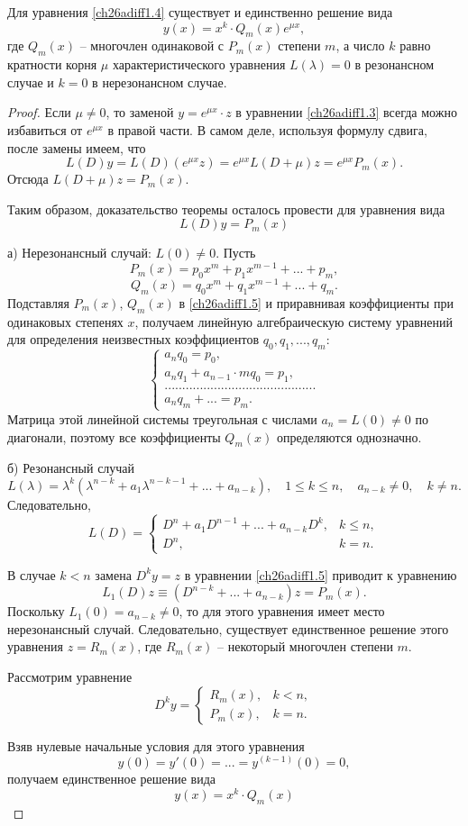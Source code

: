 \begin{thm} 
Для уравнения \eqref{ch26adiff1.4} существует и единственно решение вида
$$
y(x)=x^k\cdot Q_m(x)e^{\mu x},
$$
где $Q_m(x)$ -- многочлен одинаковой с $P_m(x)$ степени $m$, а число $k$ равно кратности корня $\mu$ характеристического уравнения $L(\lambda)=0$ в резонансном случае и $k=0$ в нерезонансном случае.
\end{thm}

\begin{proof}
Если $\mu\neq 0$, то заменой $y=e^{\mu x}\cdot z$ в уравнении \eqref{ch26adiff1.3} всегда можно избавиться от $e^{\mu x}$ в правой части. В самом деле,  используя формулу сдвига, после замены имеем, что
$$
L(D)y=L(D)(e^{\mu x}z)=e^{\mu x}L(D+\mu)z=e^{\mu x}P_m(x).
$$
Отсюда $L(D+\mu)z=P_m(x)$.

Таким образом, доказательство теоремы осталось провести для уравнения вида
\begin{equation}\label{ch26adiff1.5}
L(D)y=P_m(x)
\end{equation}

а) Нерезонансный случай: $L(0)\neq 0$. Пусть
$$
P_m(x)=p_0x^m+p_1x^{m-1}+...+p_m,
$$
$$
Q_m(x)=q_0x^m+q_1x^{m-1}+...+q_m.
$$
Подставляя $P_m(x)$, $Q_m(x)$ в \eqref{ch26adiff1.5} и приравнивая коэффициенты при одинаковых степенях $x$, получаем линейную алгебраическую систему уравнений для  определения неизвестных коэффициентов $q_0,q_1,...,q_m$:
$$
\begin{cases}
a_nq_0=p_0,\\
a_nq_1+a_{n-1}\cdot m q_0=p_1,\\
...........................................\\
a_nq_m+...=p_m.
\end{cases}
$$
Матрица этой линейной системы треугольная с числами $a_n=L(0)\neq 0$ по диагонали, поэтому все коэффициенты $Q_m(x)$ определяются однозначно.

б) Резонансный случай
$$
L(\lambda)=\lambda^k(\lambda^{n-k}+a_1\lambda^{n-k-1}+...+a_{n-k}),\quad 1\leq k \leq n,\quad a_{n-k}\neq 0,\quad k\neq n.
$$
Следовательно,
$$
L(D)=\begin{cases}
D^n+a_1D^{n-1}+...+a_{n-k}D^k, &k\le n,\\
D^n, &k=n.
\end{cases}
$$

В случае $k<n$ замена $D^ky=z$ в уравнении \eqref{ch26adiff1.5} приводит к уравнению
$$
L_1(D)z\equiv (D^{n-k}+...+a_{n-k})z=P_m(x).
$$
Поскольку $L_1(0)=a_{n-k}\neq 0$, то для этого уравнения имеет место нерезонансный случай. Следовательно, существует единственное решение этого уравнения $z=R_m(x)$, где $R_m(x)$ -- некоторый многочлен степени $m$.


Рассмотрим уравнение
$$
D^ky=\begin{cases}
R_m(x), &k<n,\\
P_m(x), &k=n.
\end{cases}
$$

Взяв нулевые начальные условия для этого уравнения
$$
y(0)=y'(0)=...=y^{(k-1)}(0)=0,
$$
получаем единственное решение вида
$$
y(x)=x^k\cdot Q_m(x)
$$
\end{proof}
